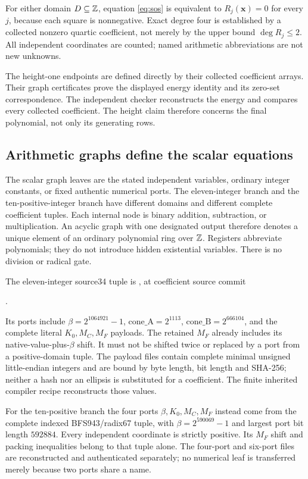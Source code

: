 For either domain $D\subseteq\mathbb Z$, equation \eqref{eq:sos} is equivalent to
$R_j(\boldsymbol{x})=0$ for every $j$, because each square is nonnegative.
Exact degree four is established by a collected nonzero quartic coefficient,
not merely by the upper bound $\deg R_j\le2$. All independent coordinates
are counted; named arithmetic abbreviations are not new unknowns.

The height-one endpoints are defined directly by their collected coefficient
arrays. Their graph certificates prove the displayed energy identity and
its zero-set correspondence. The independent checker reconstructs the
energy and compares every collected coefficient. The height claim therefore
concerns the final polynomial, not only its generating rows.

\subsection{Arithmetic graphs define the scalar equations}
The scalar graph leaves are the stated independent variables, ordinary
integer constants, or fixed authentic numerical ports. The eleven-integer
branch and the ten-positive-integer branch have different domains and
different complete coefficient tuples. Each internal node is binary addition, subtraction, or multiplication.
An acyclic graph with one designated output therefore denotes a unique
element of an ordinary polynomial ring over $\mathbb Z$. Registers abbreviate
polynomials; they do not introduce hidden existential variables. There is
no division or radical gate.

The eleven-integer source34 tuple is
, at coefficient source commit
\begin{center}\small
{}.
\end{center}
Its ports include $\beta=2^{1064921}-1$,
$\mathrm{cone\_A}=2^{1113}$, $\mathrm{cone\_B}=2^{666104}$, and the complete
literal $K_0,M_C,M_F$ payloads. The retained $M_F$ already includes its
native-value-plus-$\beta$ shift. It must not be shifted twice or replaced by
a port from a positive-domain tuple. The payload files contain complete
minimal unsigned little-endian integers and are bound by byte length,
bit length and SHA-256; neither a hash nor an ellipsis is substituted for a
coefficient. The finite inherited compiler recipe reconstructs those values.


For the ten-positive branch the four ports $\beta,K_0,M_C,M_F$ instead
come from the complete indexed BFS943/radix67 tuple, with
$\beta=2^{590069}-1$ and largest port bit length $592884$.
Every independent coordinate is strictly positive. Its $M_F$ shift and
packing inequalities belong to that tuple alone. The four-port and
six-port files are reconstructed and authenticated separately; no
numerical leaf is transferred merely because two ports share a name.

